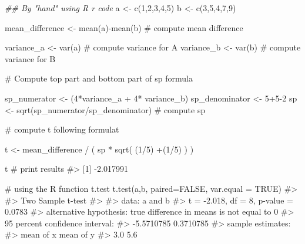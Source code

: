 \documentclass[
  letterpaper,
  DIV=11,
  numbers=noendperiod]{scrreprt}
\newenvironment{Shaded}{\begin{snugshade}}{\end{snugshade}}
\newcommand{\AttributeTok}[1]{\textcolor[rgb]{0.40,0.45,0.13}{#1}}
\newcommand{\CommentTok}[1]{\textcolor[rgb]{0.37,0.37,0.37}{#1}}
\newcommand{\ConstantTok}[1]{\textcolor[rgb]{0.56,0.35,0.01}{#1}}
\newcommand{\DecValTok}[1]{\textcolor[rgb]{0.68,0.00,0.00}{#1}}
\newcommand{\DocumentationTok}[1]{\textcolor[rgb]{0.37,0.37,0.37}{\textit{#1}}}
\newcommand{\FunctionTok}[1]{\textcolor[rgb]{0.28,0.35,0.67}{#1}}
\newcommand{\NormalTok}[1]{\textcolor[rgb]{0.00,0.23,0.31}{#1}}
\newcommand{\OtherTok}[1]{\textcolor[rgb]{0.00,0.23,0.31}{#1}}
\newcommand{\SpecialCharTok}[1]{\textcolor[rgb]{0.37,0.37,0.37}{#1}}
\begin{document}
\begin{Shaded}
\begin{Highlighting}[]

\DocumentationTok{\#\# By "hand" using R r code}
\NormalTok{a }\OtherTok{\textless{}{-}} \FunctionTok{c}\NormalTok{(}\DecValTok{1}\NormalTok{,}\DecValTok{2}\NormalTok{,}\DecValTok{3}\NormalTok{,}\DecValTok{4}\NormalTok{,}\DecValTok{5}\NormalTok{)}
\NormalTok{b }\OtherTok{\textless{}{-}} \FunctionTok{c}\NormalTok{(}\DecValTok{3}\NormalTok{,}\DecValTok{5}\NormalTok{,}\DecValTok{4}\NormalTok{,}\DecValTok{7}\NormalTok{,}\DecValTok{9}\NormalTok{)}

\NormalTok{mean\_difference }\OtherTok{\textless{}{-}} \FunctionTok{mean}\NormalTok{(a)}\SpecialCharTok{{-}}\FunctionTok{mean}\NormalTok{(b) }\CommentTok{\# compute mean difference}

\NormalTok{variance\_a }\OtherTok{\textless{}{-}} \FunctionTok{var}\NormalTok{(a) }\CommentTok{\# compute variance for A}
\NormalTok{variance\_b }\OtherTok{\textless{}{-}} \FunctionTok{var}\NormalTok{(b) }\CommentTok{\# compute variance for B}

\CommentTok{\# Compute top part and bottom part of sp formula}

\NormalTok{sp\_numerator }\OtherTok{\textless{}{-}}\NormalTok{ (}\DecValTok{4}\SpecialCharTok{*}\NormalTok{variance\_a }\SpecialCharTok{+} \DecValTok{4}\SpecialCharTok{*}\NormalTok{ variance\_b) }
\NormalTok{sp\_denominator }\OtherTok{\textless{}{-}} \DecValTok{5}\SpecialCharTok{+}\DecValTok{5{-}2}
\NormalTok{sp }\OtherTok{\textless{}{-}} \FunctionTok{sqrt}\NormalTok{(sp\_numerator}\SpecialCharTok{/}\NormalTok{sp\_denominator) }\CommentTok{\# compute sp}


\CommentTok{\# compute t following formulat}

\NormalTok{t }\OtherTok{\textless{}{-}}\NormalTok{ mean\_difference }\SpecialCharTok{/}\NormalTok{ ( sp }\SpecialCharTok{*} \FunctionTok{sqrt}\NormalTok{( (}\DecValTok{1}\SpecialCharTok{/}\DecValTok{5}\NormalTok{) }\SpecialCharTok{+}\NormalTok{(}\DecValTok{1}\SpecialCharTok{/}\DecValTok{5}\NormalTok{) ) )}

\NormalTok{t }\CommentTok{\# print results}
\CommentTok{\#\textgreater{} [1] {-}2.017991}


\CommentTok{\# using the R function t.test}
\FunctionTok{t.test}\NormalTok{(a,b, }\AttributeTok{paired=}\ConstantTok{FALSE}\NormalTok{, }\AttributeTok{var.equal =} \ConstantTok{TRUE}\NormalTok{)}
\CommentTok{\#\textgreater{} }
\CommentTok{\#\textgreater{}  Two Sample t{-}test}
\CommentTok{\#\textgreater{} }
\CommentTok{\#\textgreater{} data:  a and b}
\CommentTok{\#\textgreater{} t = {-}2.018, df = 8, p{-}value = 0.0783}
\CommentTok{\#\textgreater{} alternative hypothesis: true difference in means is not equal to 0}
\CommentTok{\#\textgreater{} 95 percent confidence interval:}
\CommentTok{\#\textgreater{}  {-}5.5710785  0.3710785}
\CommentTok{\#\textgreater{} sample estimates:}
\CommentTok{\#\textgreater{} mean of x mean of y }
\CommentTok{\#\textgreater{}       3.0       5.6}
\end{Highlighting}
\end{Shaded}
\end{document}
